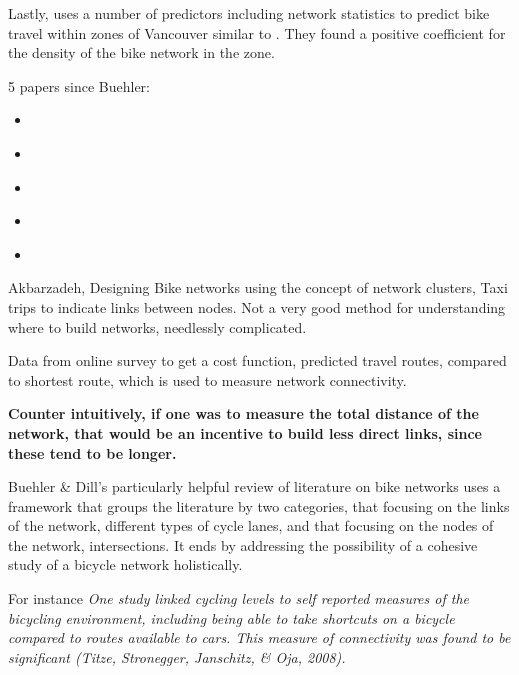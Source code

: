 \documentclass[11pt]{article} %
\begin{document}
Lastly, \cite{osama2017models} uses a number of predictors including network statistics to predict bike travel within zones of Vancouver similar to \cite{schoner2014missing}. They found a positive coefficient for the density of the bike network in the zone. 

5 papers since Buehler:
\begin{itemize}

\item \cite{boisjoly2019bicycle}
\item \cite{akbarzadeh2018designing}
\item \cite{doorley2019designing}
\item \cite{mauttone2017bicycle}
\item \cite{osama2017models}

\end{itemize}






Akbarzadeh, Designing Bike networks using the concept of network clusters, Taxi trips to indicate links between nodes. Not a very good method for understanding where to build networks, needlessly complicated. \cite{akbarzadeh2018designing}


Data from online survey to get a cost function, predicted travel routes, compared to shortest route, which is used to measure network connectivity. 

\textbf{
Counter intuitively, if one was to measure the total distance of the network, that would be an incentive to build less direct links, since these tend to be longer.}  
\cite{boisjoly2019bicycle} 

Buehler \& Dill's  particularly helpful review of literature on bike networks uses a framework that groups the literature by two categories, that focusing on the links of the network, different types of cycle lanes, and that focusing on the nodes of the network, intersections. It ends by addressing the possibility of a cohesive study of a bicycle network holistically.

	For instance \textit{One study linked cycling levels to self reported measures of the bicycling environment, including being able to take shortcuts on a bicycle compared to routes available to cars. This measure of connectivity was found to be significant (Titze, Stronegger, Janschitz, \& Oja, 2008).}
	
\end{document}
